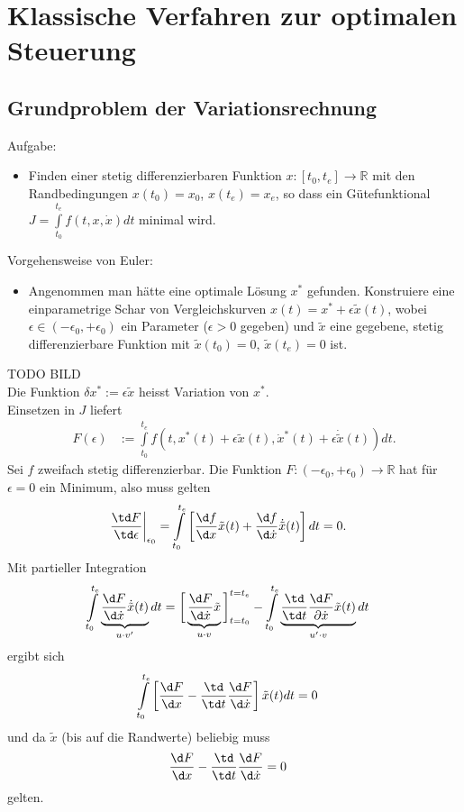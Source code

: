 \chapter{Klassische Verfahren zur optimalen Steuerung}
\section{Grundproblem der Variationsrechnung}
Aufgabe:
\begin{itemize}
  \item[] Finden einer stetig differenzierbaren Funktion $x:[t_0,t_e]\rightarrow\mathbb{R}$ mit den Randbedingungen $x(t_0)=x_0$, $x(t_e)=x_e$, so dass ein Gütefunktional
  $J=\int\limits_{t_0}^{t_e}f(t,x,\dot{x}) dt$ minimal wird.
\end{itemize}
Vorgehensweise von Euler:
\begin{itemize}
  \item[] Angenommen man hätte eine optimale Lösung $x^{\ast}$ gefunden. Konstruiere eine einparametrige Schar von Vergleichskurven $x(t)=x^{\ast}+\epsilon\tilde{x}(t)$, wobei
  $\epsilon\in(-\epsilon_0,+\epsilon_0)$ ein Parameter ($\epsilon>0$ gegeben) und $\tilde{x}$ eine gegebene, stetig differenzierbare Funktion mit $\tilde{x}(t_0)=0$, $\tilde{x}(t_e)=0$
  ist.
\end{itemize}
TODO BILD\\
Die Funktion $\delta x^{\ast}:= \epsilon\tilde{x}$ heisst Variation von $x^{\ast}$.\\
Einsetzen in $J$ liefert 
\begin{align*}
	F(\epsilon) & := \int\limits_{t_0}^{t_e}f(t,x^{\ast}(t)+\epsilon\tilde{x}(t),\dot{x}^{\ast}(t)+\epsilon\dot{\tilde{x}}(t))dt.
\end{align*}
Sei $f$ zweifach stetig differenzierbar. Die Funktion $F:(-\epsilon_0,+\epsilon_0)\rightarrow\mathbb{R}$ hat für $\epsilon=0$ ein Minimum, also muss gelten
\begin{align*}
	\left.\frac{\td F}{\td \epsilon}\right|_{\epsilon_0} & = \int\limits_{t_0}^{t_e}\left[\frac{\d f}{\d x}\tilde{x}(t)+\frac{\d f}{\d\dot{x}}\dot{\tilde{x}}(t)
	\right]dt = 0.
\end{align*}
Mit partieller Integration 
\begin{align*}
	\int\limits_{t_0}^{t_e}\underbrace{\frac{\d F}{\d \dot{x}}\dot{\tilde{x}}(t)}_{u\cdot v'}dt & = \bigg[\underbrace{\frac{\d
	F}{\d\dot{x}}\tilde{x}}_{u\cdot v}\bigg]_{t=t_0}^{t=t_e}-\int\limits_{t_0}^{t_e} \underbrace{\frac{\td}{\td t}\frac{\d F}{\partial\dot{x}}\tilde{x}(t)}_{u'\cdot v}dt
\end{align*}
ergibt sich
\begin{align*}
	\int\limits_{t_0}^{t_e}\left[\frac{\d F}{\d x}-\frac{\td}{\td t}\frac{\d F}{\d\dot{x}} \right]\tilde{x}(t)dt & = 0
\end{align*}
und da $\tilde{x}$ (bis auf die Randwerte) beliebig muss 
\begin{align}
	\frac{\d F}{\d x}-\frac{\td}{\td t}\frac{\d F}{\d\dot{x}} & = 0
\end{align}
gelten.

